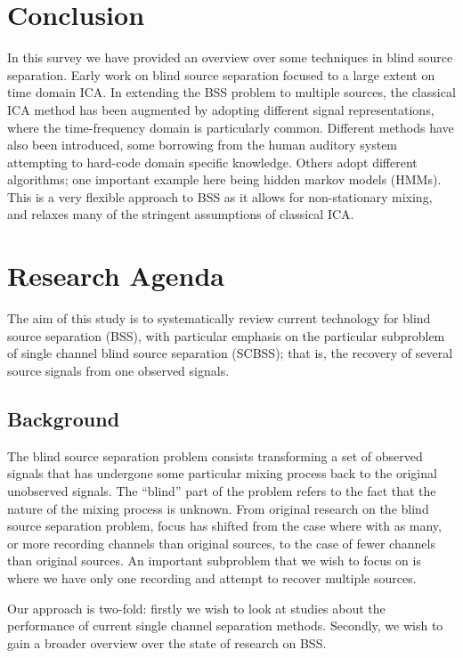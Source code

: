 \documentclass[11pt, oneside, a4paper]{article}
\begin{document}
\section{Conclusion}

In this survey we have provided an overview over some techniques in
blind source separation. Early work on blind source separation focused
to a large extent on time domain ICA. In extending the BSS problem to
multiple sources, the classical ICA method has been augmented by
adopting different signal representations, where the time-frequency
domain is particularly common. Different methods have also been
introduced, some borrowing from the human auditory system attempting
to hard-code domain specific knowledge. Others adopt different
algorithms; one important example here being hidden markov models
(HMMs). This is a very flexible approach to BSS as it allows for
non-stationary mixing, and relaxes many of the stringent assumptions
of classical ICA. 

\newpage
\appendix


\section{Research Agenda}
The aim of this study is to systematically review current technology
for blind source separation (BSS), with particular emphasis on the
particular subproblem of single channel blind source separation
(SCBSS); that is, the recovery of several source signals from one observed signals.


\subsection{Background}
The blind source separation problem consists transforming a set of observed signals that has undergone some particular mixing process back to the original unobserved signals. The “blind” part of the problem refers to the fact that the nature of the mixing process is unknown. From original research on the blind source separation problem, focus has shifted from the case where with as many, or more recording channels than original sources, to the case of fewer channels than original sources. An important subproblem that we wish to focus on is where we have only one recording and attempt to recover multiple sources.

Our approach is two-fold: firstly we wish to look at studies about the performance of current single channel separation methods. Secondly, we wish to gain a broader overview over the state of research on BSS.
\end{document}
